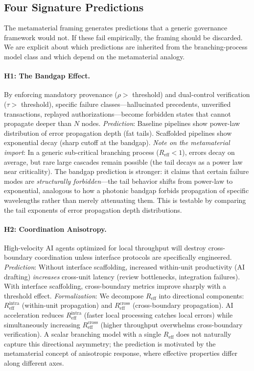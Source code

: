 \documentclass[runningheads]{llncs}
\begin{document}
\subsection{Four Signature Predictions}

The metamaterial framing generates predictions that a generic governance framework would not. If these fail empirically, the framing should be discarded. We are explicit about which predictions are inherited from the branching-process model class and which depend on the metamaterial analogy.

\paragraph{H1: The Bandgap Effect.}
By enforcing mandatory provenance ($\rho >$ threshold) and dual-control verification ($\tau >$ threshold), specific failure classes---hallucinated precedents, unverified transactions, replayed authorizations---become forbidden states that cannot propagate deeper than $N$ nodes. \emph{Prediction}: Baseline pipelines show power-law distribution of error propagation depth (fat tails). Scaffolded pipelines show exponential decay (sharp cutoff at the bandgap). \emph{Note on the metamaterial import}: In a generic sub-critical branching process ($R_{\mathrm{eff}} < 1$), errors decay on average, but rare large cascades remain possible (the tail decays as a power law near criticality). The bandgap prediction is stronger: it claims that certain failure modes are \emph{structurally forbidden}---the tail behavior shifts from power-law to exponential, analogous to how a photonic bandgap forbids propagation of specific wavelengths rather than merely attenuating them. This is testable by comparing the tail exponents of error propagation depth distributions.

\paragraph{H2: Coordination Anisotropy.}
High-velocity AI agents optimized for local throughput will destroy cross-boundary coordination unless interface protocols are specifically engineered. \emph{Prediction}: Without interface scaffolding, increased within-unit productivity (AI drafting) \emph{increases} cross-unit latency (review bottlenecks, integration failures). With interface scaffolding, cross-boundary metrics improve sharply with a threshold effect. \emph{Formalization}: We decompose $R_{\mathrm{eff}}$ into directional components: $R_{\mathrm{eff}}^{\mathrm{intra}}$ (within-unit propagation) and $R_{\mathrm{eff}}^{\mathrm{cross}}$ (cross-boundary propagation). AI acceleration reduces $R_{\mathrm{eff}}^{\mathrm{intra}}$ (faster local processing catches local errors) while simultaneously increasing $R_{\mathrm{eff}}^{\mathrm{cross}}$ (higher throughput overwhelms cross-boundary verification). A scalar branching model with a single $R_{\mathrm{eff}}$ does not naturally capture this directional asymmetry; the prediction is motivated by the metamaterial concept of anisotropic response, where effective properties differ along different axes.
\end{document}
